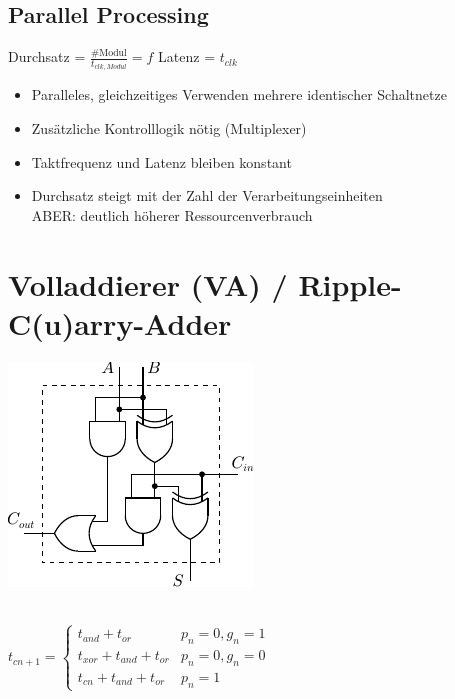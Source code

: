 \documentclass[6pt,a4paper]{scrartcl}
\begin{document}
\begin{multicols}{3}
\subsection{Parallel Processing} %

Durchsatz = $\frac{\#\text{Modul}}{t_{clk,Modul}} = f$ \qquad \quad Latenz = $t_{clk}$
\begin{itemize} \itemsep0pt
	\item Paralleles, gleichzeitiges Verwenden mehrere identischer Schaltnetze
	\item Zusätzliche Kontrolllogik nötig (Multiplexer)
	\item Taktfrequenz und Latenz bleiben konstant
	\item Durchsatz steigt mit der Zahl der Verarbeitungseinheiten \\
	ABER: deutlich höherer Ressourcenverbrauch
\end{itemize}

\section{Volladdierer (VA) / Ripple-C(u)arry-Adder}
\parbox{5.0cm}{ \includegraphics{./img/ds/volladdierer.pdf} }
\\
$t_{cn+1} = \begin{cases} t_{and} + t_{or} & p_n = 0, g_n=1 \\ t_{xor} + t_{and} + t_{or} & p_n = 0, g_n = 0 \\ t_{cn} + t_{and} + t_{or} & p_n = 1 \end{cases}$\\





\end{multicols}
\end{document}
